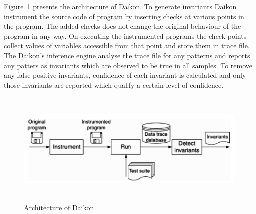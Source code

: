 Figure~\ref{fig:daikon} presents the architecture of Daikon. To generate invariants Daikon instrument the source code of  program by inserting checks at various points in the program. The added checks does not change the original behaviour of the program in any way. On executing the instrumented programs the check points collect values of variables accessible from that point and store them in trace file. The Daikon's inference engine analyse the trace file for any patterns and reports any patters as invariants which are observed to be true in all samples. To remove any false positive invariants, confidence of each invariant is calculated and only those invariants are reported which qualify a certain level of confidence. 

\bigskip
\begin{figure}[H]
\centering
\includegraphics[width= 15.5cm,height=5.5cm]{chapter7/daikon.png}
\bigskip
\caption{Architecture of Daikon~\cite{ernst2001dynamically}}
\label{fig:daikon}
\end{figure}
\bigskip

